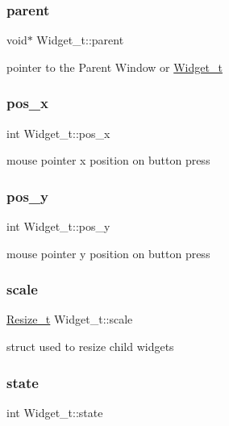 \subsubsection{\texorpdfstring{parent}{parent}}
{\footnotesize\ttfamily void$\ast$ Widget\+\_\+t\+::parent}

pointer to the Parent Window or \hyperlink{structWidget__t}{Widget\+\_\+t} \mbox{\label{structWidget__t_ae2d46ffb30bb2335a043d138fa05e1a3}} 
\subsubsection{\texorpdfstring{pos\+\_\+x}{pos\_x}}
{\footnotesize\ttfamily int Widget\+\_\+t\+::pos\+\_\+x}

mouse pointer x position on button press \mbox{\label{structWidget__t_a9b127ac6b3f017b367351ee673e063c3}} 
\subsubsection{\texorpdfstring{pos\+\_\+y}{pos\_y}}
{\footnotesize\ttfamily int Widget\+\_\+t\+::pos\+\_\+y}

mouse pointer y position on button press \mbox{\label{structWidget__t_a9a2d5b53f40f5bf3914fc0694027d7ec}} 
\subsubsection{\texorpdfstring{scale}{scale}}
{\footnotesize\ttfamily \hyperlink{structResize__t}{Resize\+\_\+t} Widget\+\_\+t\+::scale}

struct used to resize child widgets \mbox{\label{structWidget__t_aaa935b64805fdeb78acb015c67d6638c}} 
\subsubsection{\texorpdfstring{state}{state}}
{\footnotesize\ttfamily int Widget\+\_\+t\+::state}

